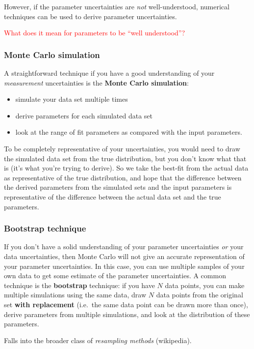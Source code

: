 \documentclass{article}
\newcommand{\mynotes}[1]{%
    \fontfamily{phv}\selectfont\textcolor{myGreen}{#1}
    }
\begin{document}
However, if the parameter uncertainties are \emph{not} well-understood,
numerical techniques can be used to derive parameter uncertainties.

\textcolor{red}{What does it mean for parameters to be ``well understood''?}

\subsubsection{Monte Carlo simulation}
A straightforward technique if you have a good understanding of your
\emph{measurement} uncertainties is the \textbf{Monte Carlo simulation}:
\begin{itemize}
    \item simulate your data set multiple times
    \item derive parameters for each simulated data set
    \item look at the range of fit parameters as compared with
        the input parameters.
\end{itemize}
To be completely representative of your uncertainties, you would need to draw
the simulated data set from the true distribution, but you don't know what that
is (it's what you're trying to derive). So we take the best-fit from the actual
data as representative of the true distribution, and hope that the difference
between the derived parameters from the simulated sets and the input parameters
is representative of the difference between the actual data set and the true
parameters.

\subsubsection{Bootstrap technique}
If you don't have a solid understanding of your parameter uncertainties
\emph{or} your data uncertainties, then Monte Carlo will not give an accurate
representation of your parameter uncertainties. In this case, you can use
multiple samples of your own data to get some estimate of the parameter
uncertainties. A common technique is the \textbf{bootstrap} technique: if you
have $N$ data points, you can make multiple simulations using the same data,
draw $N$ data points from the original set \textbf{with replacement} (i.e.\ the
same data point can be drawn more than once), derive parameters from multiple
simulations, and look at the distribution of these parameters.

\mynotes{Falls into the broader class of \textit{resampling methods}
    (wikipedia).}
\end{document}
